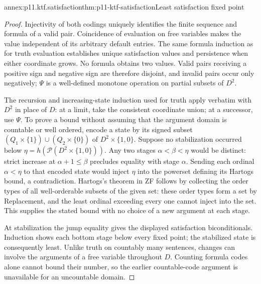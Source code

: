 \begin{annexitem}{annex:p11.ktf.satisfaction}{thm:p11-ktf-satisfaction}{Least satisfaction fixed point}
\begin{proof}
Injectivity of both codings uniquely identifies the finite sequence and
formula of a valid pair. Coincidence of evaluation on free variables
makes the value independent of its arbitrary default entries. The same
formula induction as for truth evaluation establishes unique satisfaction
values and persistence when either coordinate grows. No formula obtains
two values. Valid pairs receiving a positive sign and negative sign are
therefore disjoint, and invalid pairs occur only negatively; \(\Psi\)
is a well-defined monotone operation on partial subsets of \(D^2\).

The recursion and increasing-state induction used for truth apply verbatim
with \(D^2\) in place of \(D\): at a limit, take the consistent
coordinate union; at a successor, use \(\Psi\). To prove a bound
without assuming that the argument domain is countable or well ordered,
encode a state by its signed subset
\((Q_1\times\{1\})\cup(Q_2\times\{0\})\) of
\(D^2\times\{1,0\}\). Suppose no stabilization occurred below
\(\eta=h(\mathcal P(D^2\times\{1,0\}))\). Any two stages
\(\alpha<\beta<\eta\) would be distinct: strict increase at
\(\alpha+1\leq\beta\) precludes equality with stage \(\alpha\).
Sending each ordinal \(\alpha<\eta\) to that encoded state would
inject \(\eta\) into the powerset defining its Hartogs bound, a
contradiction. Hartogs's theorem in ZF follows by collecting the order
types of all well-orderable subsets of the given set: these order types
form a set by Replacement, and the least ordinal exceeding every one
cannot inject into the set. This supplies the stated bound with no choice
of a new argument at each stage.

At stabilization the jump equality gives the displayed satisfaction
biconditionals. Induction shows each bottom stage below every fixed point;
the stabilized state is consequently least. Unlike truth on countably
many sentences, changes can involve the arguments of a free variable
throughout \(D\). Counting formula codes alone cannot bound their
number, so the earlier countable-code argument is unavailable for an
uncountable domain.
\end{proof}
\end{annexitem}

